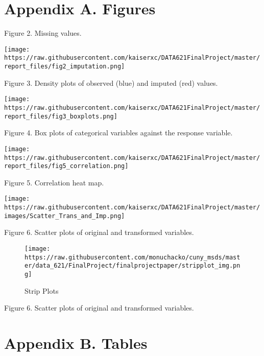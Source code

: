 \documentclass[
]{article}
\begin{document}
\hypertarget{appendix-a.-figures}{%
\section{Appendix A. Figures}\label{appendix-a.-figures}}

\begin{center}
Figure 2. Missing values.
\end{center}

\texttt{[image: https://raw.githubusercontent.com/kaiserxc/DATA621FinalProject/master/report\_files/fig2\_imputation.png]}

\begin{center}
Figure 3. Density plots of observed (blue) and imputed (red) values.
\end{center}

\texttt{[image: https://raw.githubusercontent.com/kaiserxc/DATA621FinalProject/master/report\_files/fig3\_boxplots.png]}

\begin{center}
Figure 4. Box plots of categorical variables against the response variable.
\end{center}

\texttt{[image: https://raw.githubusercontent.com/kaiserxc/DATA621FinalProject/master/report\_files/fig5\_correlation.png]}

\begin{center}
Figure 5. Correlation heat map.
\end{center}

\texttt{[image: https://raw.githubusercontent.com/kaiserxc/DATA621FinalProject/master/images/Scatter\_Trans\_and\_Imp.png]}

\begin{center}
Figure 6. Scatter plots of original and transformed variables.
\end{center}

\begin{figure}
\centering
\texttt{[image: https://raw.githubusercontent.com/monuchacko/cuny\_msds/master/data\_621/FinalProject/finalprojectpaper/stripplot\_img.png]}
\caption{Strip Plots}
\end{figure}

\begin{center}
Figure 6. Scatter plots of original and transformed variables.
\end{center}

\newpage

\hypertarget{appendix-b.-tables}{%
\section{Appendix B. Tables}\label{appendix-b.-tables}}
\end{document}
